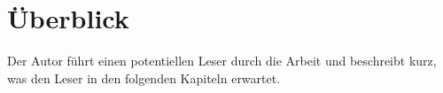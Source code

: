 \begin{comment}


The field of SMPC has flourished with the rise of cloud computing
and data-sharing in IoT environments. However, the literature on
the practical application of SMPC protocols on resource-constrained
devices is lacking. Prior research has mostly been focused on devel-
oping secure protocols and testing them in virtual environments,
rather than on devices like an Arduino. Therefore, this research aims
to contribute to the literature by gaining insights into the practical
\end{comment}


\section{Überblick}
Der Autor führt einen potentiellen Leser durch die Arbeit und beschreibt kurz, was den Leser in den folgenden Kapiteln erwartet.



